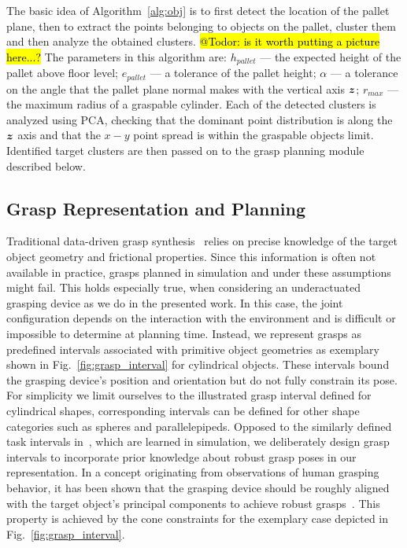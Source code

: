 The basic idea of Algorithm~\ref{alg:obj} is to first detect the location of the pallet plane, then
to extract the points belonging to objects on the pallet, cluster them and then analyze the obtained
clusters. \hl{@Todor: is it worth putting a picture here...?} The parameters in this algorithm are:
$h_{pallet}$ --- the expected height of the pallet above floor level; $e_{pallet}$ --- a tolerance
of the pallet height; $\alpha$ --- a tolerance on the angle that the pallet plane normal makes with
the vertical axis $\mbox{\boldmath $z$}$; $r_{max}$ --- the maximum radius of a graspable cylinder. Each of the
detected clusters is analyzed using PCA, checking that the dominant point distribution is along the
$\mbox{\boldmath $z$}$ axis and that the $x-y$ point spread is within the graspable objects limit. Identified
target clusters are then passed on to the grasp planning module described below.
%
\subsection{Grasp Representation and Planning}
\label{subsec:grasp_planning}
%
Traditional data-driven grasp synthesis~\cite{Bohg14} relies on precise knowledge of the target
object geometry and frictional properties. Since this information is often not available in
practice, grasps planned in simulation and under these assumptions might fail. This holds especially
true, when considering an underactuated grasping device as we do in the presented work. In this
case, the joint configuration depends on the interaction with the environment and is difficult or
impossible to determine at planning time. Instead, we represent grasps as predefined intervals
associated with primitive object geometries as exemplary shown in Fig.~\ref{fig:grasp_interval} for
cylindrical objects. These intervals bound the grasping device's position and orientation but do not
fully constrain its pose. For simplicity we limit ourselves to the illustrated grasp interval
defined for cylindrical shapes, corresponding intervals can be defined for other shape categories
such as spheres and parallelepipeds. Opposed to the similarly defined task intervals
in~\cite{Gien08a, Gien08b}, which are learned in simulation, we deliberately design grasp intervals
to incorporate prior knowledge about robust grasp poses in our representation. In a concept
originating from observations of human grasping behavior, it has been shown that the grasping device
should be roughly aligned with the target object's principal components to achieve robust
grasps~\cite{Bala12}. This property is achieved by the cone constraints for the exemplary case
depicted in Fig.~\ref{fig:grasp_interval}.

